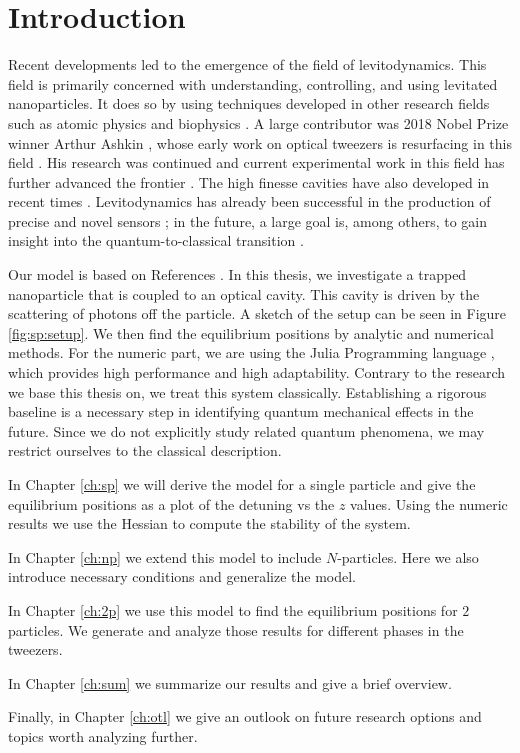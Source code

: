 \chapter{Introduction}
\label{intro}

Recent developments led to the emergence of the field of levitodynamics.
This field is primarily concerned with understanding, controlling, and using levitated nanoparticles.
It does so by using techniques developed in other research fields such as atomic physics and biophysics \cite{doi:10.1126/science.abg3027}.
A large contributor was 2018 Nobel Prize winner Arthur Ashkin \cite{10.1063/1.88748,PhysRevLett.24.156},
    whose early work on optical tweezers is resurfacing in this field \cite{PhysRevLett.122.123601}.
His research was continued 
    and current experimental work in this field has further advanced the frontier \cite{troyer2025quantumgroundstatecoolinglibrational}.
The high finesse cavities have also developed in recent times \cite{PhysRevLett.133.233603,Millen_2020}.
Levitodynamics has already been successful in the production of precise and novel sensors \cite{Moore_2021,doi:10.1126/sciadv.abo2361};
    in the future, a large goal is, among others, to gain insight into the quantum-to-classical transition \cite{gupta2025quantumtheoryelectricallylevitated,Millen_2020}.
\par 
Our model is based on References \cite{Maurer_2023,Gonzalez_Ballestero_2019}.
In this thesis, we investigate a trapped nanoparticle
    that is coupled to an optical cavity.
This cavity is driven by the scattering of photons off the particle.
A sketch of the setup can be seen in Figure \ref{fig:sp:setup}.
We then find the equilibrium positions by analytic and numerical methods.
For the numeric part, we are using the Julia Programming language \cite{Julia-2017},
    which provides high performance and high adaptability.
Contrary to the research we base this thesis on, 
    we treat this system classically.
Establishing a rigorous baseline is a necessary step in identifying quantum mechanical effects in the future.
Since we do not explicitly study related quantum phenomena,
    we may restrict ourselves to the classical description.
\par
In Chapter \ref{ch:sp} we will derive the model for a single particle 
    and give the equilibrium positions as a plot of the detuning vs the $z$ values.
Using the numeric results we use the Hessian to compute the stability of the system.
\par
In Chapter \ref{ch:np} we extend this model to include $N$-particles. 
Here we also introduce necessary conditions 
    and generalize the model.
\par
In Chapter \ref{ch:2p} we use this model to find the equilibrium positions for $2$ particles.
We generate and analyze those results for different phases in the tweezers.
\par
In Chapter \ref{ch:sum} we summarize our results 
    and give a brief overview.
\par
Finally, in Chapter \ref{ch:otl} we give an outlook on future research options 
    and topics worth analyzing further.
